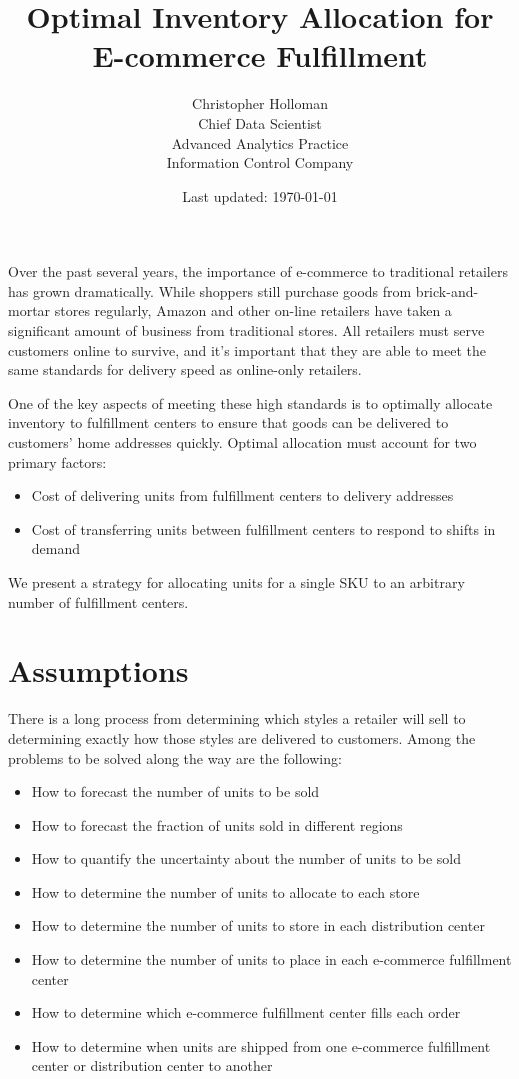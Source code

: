 \documentclass[11pt, oneside]{article}   	%
\title{Optimal Inventory Allocation for E-commerce Fulfillment}
\author{Christopher Holloman \\ Chief Data Scientist \\ Advanced Analytics Practice \\ Information Control Company}
\date{Last updated: \today}							%
\begin{document}
\maketitle

Over the past several years, the importance of e-commerce to traditional retailers has grown dramatically.  While shoppers still purchase goods from brick-and-mortar stores regularly, Amazon and other on-line retailers have taken a significant amount of business from traditional stores.  All retailers must serve customers online to survive, and it's important that they are able to meet the same standards for delivery speed as online-only retailers.

One of the key aspects of meeting these high standards is to optimally allocate inventory to fulfillment centers to ensure that goods can be delivered to customers' home addresses quickly.  Optimal allocation must account for two primary factors:

\begin{itemize}
\item Cost of delivering units from fulfillment centers to delivery addresses
\item Cost of transferring units between fulfillment centers to respond to shifts in demand
\end{itemize}

We present a strategy for allocating units for a single SKU to an arbitrary number of fulfillment centers.

\section{Assumptions}

There is a long process from determining which styles a retailer will sell to determining exactly how those styles are delivered to customers.  Among the problems to be solved along the way are the following:

\begin{itemize}
\item How to forecast the number of units to be sold
\item How to forecast the fraction of units sold in different regions
\item How to quantify the uncertainty about the number of units to be sold
\item How to determine the number of units to allocate to each store
\item How to determine the number of units to store in each distribution center
\item How to determine the number of units to place in each e-commerce fulfillment center
\item How to determine which e-commerce fulfillment center fills each order
\item How to determine when units are shipped from one e-commerce fulfillment center or distribution center to another
\end{itemize}
\end{document}
